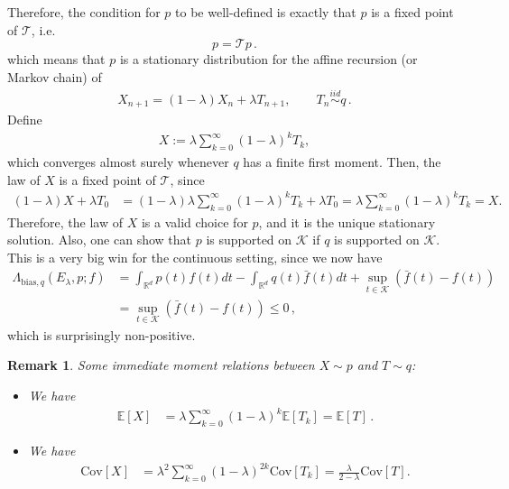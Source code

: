 \documentclass{article}
\theoremstyle{plain}
\theoremstyle{definition}
\theoremstyle{plain}
\newtheorem{remark}[theorem]{Remark}
\newcommand{\Rd}{\mathbb{R}^d}
\newcommand{\E}{\mathbb E}
\newcommand{\K}{\mathcal K}
\newcommand{\cT}{\mathcal T}
\newcommand{\cK}{\mathcal K}
\begin{document}
Therefore, the condition for $p$ to be well-defined is exactly that $p$ is a fixed point of $\cT$, i.e.
\begin{equation}
    p = \cT p\,.
    \label{eq:fixed_point_condition}
\end{equation}
which means that $p$ is a stationary distribution for the affine recursion (or Markov chain) of
\begin{align}
    X_{n+1} = (1-\lambda) X_n + \lambda T_{n+1}, \qquad
    T_n \stackrel{iid}{\sim} q\,.
\end{align}
Define
\begin{align}
    X := \lambda \sum_{k=0}^\infty (1-\lambda)^k T_{k},
\end{align}
which converges almost surely whenever $q$ has a finite first moment.
Then, the law of $X$ is a fixed point of $\cT$, since
\begin{align}
    (1-\lambda) X + \lambda T_0
     & = (1-\lambda) \lambda \sum_{k=0}^\infty (1-\lambda)^k T_{k} + \lambda T_0
    = \lambda \sum_{k=0}^\infty (1-\lambda)^k T_{k} = X.
\end{align}
Therefore, the law of $X$ is a valid choice for $p$,
and it is the unique stationary solution.
Also, one can show that $p$ is supported on $\cK$ if $q$ is supported on $\cK$.
This is a very big win for the continuous setting, since we now have
\begin{align}
    \Lambda_{\mathrm{bias}, q}(E_\lambda, p; f)
     & =
    \int_{\Rd} p(t) f(t) dt - \int_{\Rd} q(t) \bar{f}(t) dt + \sup_{t\in \K} (\bar{f}(t) - f(t))
    \\
     & =
    \sup_{t\in \K} (\bar{f}(t) - f(t))
    \le 0\,,
\end{align}
which is surprisingly non-positive.
\begin{remark}
    Some immediate moment relations between $X \sim p$ and $T\sim q$:
    \begin{itemize}
        \item We have
              \begin{align}
                  \E[X] & = \lambda \sum_{k=0}^\infty (1-\lambda)^k \E[T_k] = \E[T]\,.
              \end{align}
        \item We have
              \begin{align}
                  \mathrm{Cov}[X]
                   & = \lambda^2 \sum_{k=0}^\infty (1-\lambda)^{2k} \mathrm{Cov}[T_k]
                  = \frac{\lambda}{2-\lambda} \mathrm{Cov}[T].
              \end{align}
    \end{itemize}
\end{remark}
\end{document}
